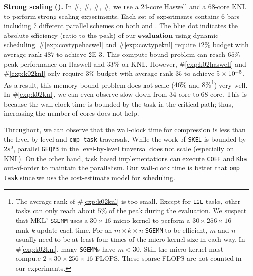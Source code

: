 \textbf{Strong scaling ().}
In 
\#\rownumber\label{exp:covtypehaswel}, 
\#\rownumber\label{exp:covtypeknl}, 
\#\rownumber\label{exp:k02haswell}, 
\#\rownumber\label{exp:k02knl}, 
we use a 24-core Haswell and a 68-core KNL to perform strong scaling
experiments. Each set of experiments contains 6 bars including 3 different
parallel schemes on both  and .
The blue dot indicates the absolute efficiency (ratio to the peak) of 
our \textbf{evaluation} using dynamic scheduling.
\#\ref{exp:covtypehaswel} and
\#\ref{exp:covtypeknl} require $12\%$ budget with 
average rank $487$ to achieve \num{2E-3}. 
This compute-bound problem can reach $65\%$ peak performance on Haswell and $33\%$ on KNL.
However, \#\ref{exp:k02haswell} and \#\ref{exp:k02knl}
only require $3\%$ budget with average rank $35$ 
to achieve $\num{5E-5}$. As a result, this memory-bound problem does not 
scale ($46\%$ and $8\%$\footnote{\scriptsize
The average rank of \#\ref{exp:k02knl} is too small. Except for
\texttt{L2L} tasks, other tasks can only reach about $5\%$
of the peak during the evaluation.
We suspect that MKL' \texttt{SGEMM} uses a $30\times16$ 
micro-kernel to perform a $30\times256\times16$ rank-$k$ update
each time. For an $m\times k\times n$ \texttt{SGEMM} to be efficient, 
$m$ and $n$ usually need to be at least four times of the
micro-kernel size in each way. 
In \#\ref{exp:k02knl}, many \texttt{SGEMM}s have $m<30$. 
Still the micro-kernel must compute $2\times30\times256\times16$ FLOPS.
These sparse FLOPS are not counted in our experiments.
}) very well.  In \#\ref{exp:k02knl}, we can even observe slow down from 34-core to 68-core.
This is because the wall-clock time is bounded by the task in the critical path;
thus, increasing the number of cores does not help.

Throughout, we can observe that the wall-clock time for compression is less than
the level-by-level and \texttt{omp task} traversals. While the work
of \texttt{SKEL} is bounded by $2s^3$, parallel \texttt{GEQP3} in the
level-by-level traversal does not scale (especially on KNL).  On the
other hand, task based implementations can execute \texttt{COEF}
and \texttt{Kba} out-of-order to maintain the parallelism. Our wall-clock time
is better that \texttt{omp task} since we use the cost-estimate model
for scheduling.


